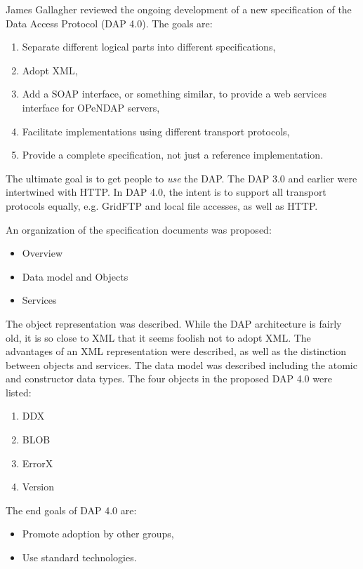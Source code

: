 James Gallagher reviewed the ongoing development of a new
specification of the Data Access Protocol (DAP 4.0).  The goals are:

\begin{enumerate}
  \item Separate different logical parts into different specifications,
  \item Adopt \ac{XML},
  \item Add a \ac{SOAP} interface, or something similar, to provide a
        web services interface for \ac{OPeNDAP} servers, 
  \item Facilitate implementations using different transport protocols,
  \item Provide a complete specification, not just a reference 
        implementation.
\end{enumerate}

The ultimate goal is to get people to \emph{use} the \ac{DAP}.
The \ac{DAP} 3.0 and earlier were intertwined with \ac{HTTP}.
In \ac{DAP} 4.0, the intent is to support all transport protocols
equally, e.g. \ac{GridFTP} and local file accesses, as well as 
\ac{HTTP}.  

An organization of the specification documents was proposed:

\begin{itemize}
  \item Overview
  \item Data model and Objects
  \item Services
\end{itemize}

The object representation was described.  While the \ac{DAP} 
architecture is fairly old, it is so close to XML that it seems
foolish not to adopt XML.  The advantages of an XML representation
were described, as well as the distinction between objects and
services.  The data model was described including the atomic and
constructor data types.  The four objects in the proposed \ac{DAP}
4.0 were listed:

\begin{enumerate}
  \item \ac{DDX}
  \item \ac{BLOB}
  \item ErrorX
  \item Version
\end{enumerate}

The end goals of DAP 4.0 are:

\begin{itemize}
  \item Promote adoption by other groups,
  \item Use standard technologies.
\end{itemize}

